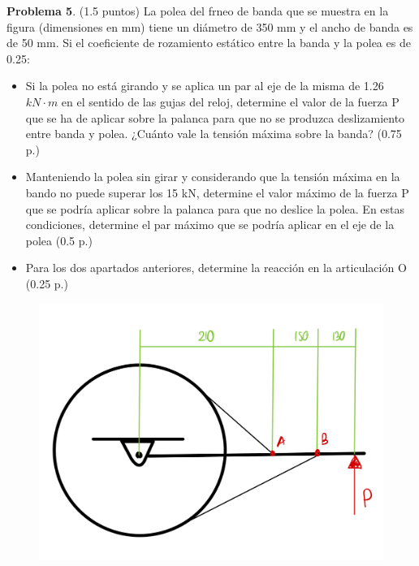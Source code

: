 \documentclass[10pt]{article}
\begin{document}
\textbf{Problema 5}. (1.5 puntos) La polea del frneo de banda que se muestra en la figura (dimensiones en mm) tiene un diámetro de 350 mm y el ancho de banda es de 50 mm. Si el coeficiente de rozamiento estático entre la banda y la polea es de 0.25:
\begin{itemize}
    \item Si la polea no está girando y se aplica un par al eje de la misma de 1.26 $kN\cdot m$ en el sentido de las gujas del reloj, determine el valor de la fuerza P que se ha de aplicar sobre la palanca para que no se produzca deslizamiento entre banda y polea. ¿Cuánto vale la tensión máxima sobre la banda? (0.75 p.)
    \item Manteniendo la polea sin girar y considerando que la tensión máxima en la bando no puede superar los 15 kN, determine el valor máximo de la fuerza P que se podría aplicar sobre la palanca para que no deslice la polea. En estas condiciones, determine el par máximo que se podría aplicar en el eje de la polea (0.5 p.)
    \item Para los dos apartados anteriores, determine la reacción en la articulación O (0.25 p.)
\end{itemize}
\begin{figure}[h!]
  \centering
  \includegraphics[width=0.35\linewidth]{problema_5.jpeg}
  \label{fig:}
\end{figure}
\end{document}

